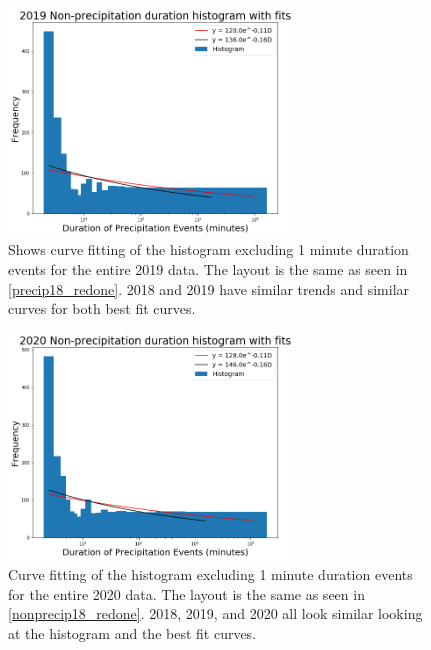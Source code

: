 \documentclass[11pt]{report}
\begin{document}
\clearpage

\begin{figure}[t]
  \centering
  \includegraphics[width=0.675\textwidth]{Figures/nonprecip_2019_new.png}
  \caption[2019 Non-precipitation duration Exponentials with contrasting curve fitting]
  {\label{nonprecip19_redone} Shows curve fitting of the histogram excluding
    1 minute duration events for the entire 2019 data. The layout is the
    same as seen in \ref{precip18_redone}. 2018 and 2019 have similar trends
    and similar curves for both best fit curves.}
\end{figure}

\begin{figure}[b]
  \centering
  \includegraphics[width=0.675\textwidth]{Figures/nonprecip_2020_new.png}
  \caption[2020 Non-precipitation duration Exponentials with contrasting curve fitting]
  {\label{nonprecip20_redone}Curve fitting of the histogram excluding
    1 minute duration events for the entire 2020 data. The layout is the
    same as seen in \ref{nonprecip18_redone}. 2018, 2019, and 2020 all look
    similar looking at the histogram and the best fit curves.}
\end{figure}
\end{document}
